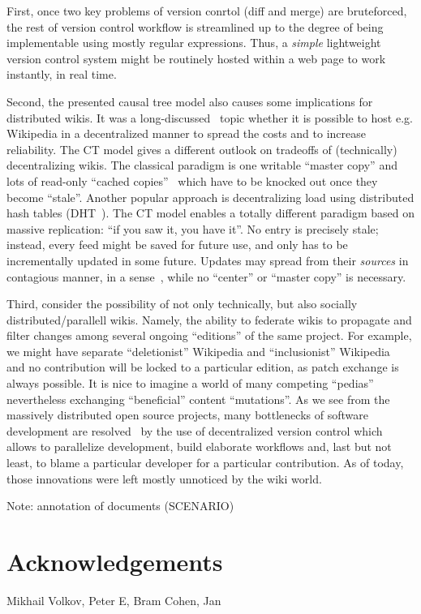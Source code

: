 \documentclass{acm_proc_article-sp}
\begin{document}
First, once two key problems of version conrtol (diff and merge) are bruteforced, the rest of version control workflow is streamlined up to the degree of being implementable using mostly regular expressions. Thus, a \emph{simple} lightweight version control system might be routinely hosted within a web page to work instantly, in real time.

Second, the presented causal tree model also causes some implications for distributed wikis. It was a long-discussed~\cite{dht-wiki,piki} topic whether it is possible to host e.g. Wikipedia in a decentralized manner to spread the costs and to increase reliability. The CT model gives a different outlook on tradeoffs of (technically) decentralizing wikis. The classical paradigm is one writable ``master copy'' and lots of read-only ``cached copies''~\cite{steen-wiki} which have to be knocked out once they become ``stale''. Another popular approach is decentralizing load using distributed hash tables (DHT~\cite{dht-wiki}). The CT model enables a totally different paradigm based on massive replication: ``if you saw it, you have it''. No entry is precisely stale; instead, every feed might be saved for future use, and only has to be incrementally updated in some future. Updates may spread from their \emph{sources} in contagious manner, in a sense~\cite{contagious}, while no ``center'' or ``master copy'' is necessary.


Third, consider the possibility of not only technically, but also socially distributed/parallell wikis. Namely, the ability to federate wikis to propagate and filter changes among several ongoing ``editions'' of the same project. For example, we might have separate ``deletionist'' Wikipedia and ``inclusionist'' Wikipedia~\cite{delinc} and no contribution will be locked to a particular edition, as patch exchange is always possible. It is nice to imagine a world of many competing ``pedias'' nevertheless exchanging ``beneficial'' content ``mutations''. As we see from the massively distributed open source projects, many bottlenecks of software development are resolved~\cite{git} by the use of decentralized version control which allows to parallelize development, build elaborate workflows and, last but not least, to blame a particular developer for a particular contribution. As of today, those innovations were left mostly unnoticed by the wiki world.

Note: annotation of documents (SCENARIO)

\section{Acknowledgements}

Mikhail Volkov, Peter E, Bram Cohen, Jan
\end{document}

